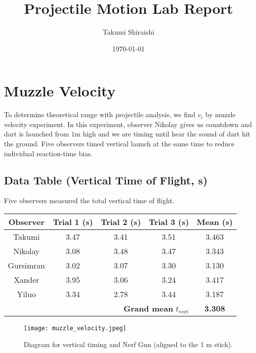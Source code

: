 \documentclass[12pt]{article}
\begin{document}
\title{Projectile Motion Lab Report}
\author{Takumi Shiraishi}
\date{\today}
\maketitle

\tableofcontents
\vspace{1cm}


\newpage
\section{Muzzle Velocity}
To determine theoretical range with projectile analysis, we find $v_i$ by muzzle velocity experiment. In this experiment, observer Nikolay gives us countdown and dart is launched from $1\mathrm{m}$ high and we are timing until hear the sound of dart hit the ground.
Five observers timed vertical launch at the same time to reduce individual reaction-time bias.

\subsection{Data Table (Vertical Time of Flight, s)}
Five observers measured the total vertical time of flight.

\begin{center}
\begin{tabular}{|c|c|c|c|c|}
\hline
Observer & Trial 1 (s) & Trial 2 (s) & Trial 3 (s) & Mean (s)\\ \hline
Takumi & 3.47 & 3.41 & 3.51 & 3.463 \\ \hline
Nikolay & 3.08 & 3.48 & 3.47 & 3.343 \\ \hline
Gursimran & 3.02 & 3.07 & 3.30 & 3.130 \\ \hline
Xander & 3.95 & 3.06 & 3.24 & 3.417 \\ \hline
Yiluo & 3.34 & 2.78 & 3.44 & 3.187 \\ \hline
\multicolumn{4}{|r|}{\textbf{Grand mean} $ t_{\mathrm{vert}}$} & \textbf{3.308} \\ \hline
\end{tabular}
\end{center}

\begin{figure}[H]
  \centering
  \texttt{[image: muzzle\_velocity.jpeg]}
  \caption*{Diagram for vertical timing and Nerf Gun (aligned to the 1 m stick).}
\end{figure}
\end{document}
